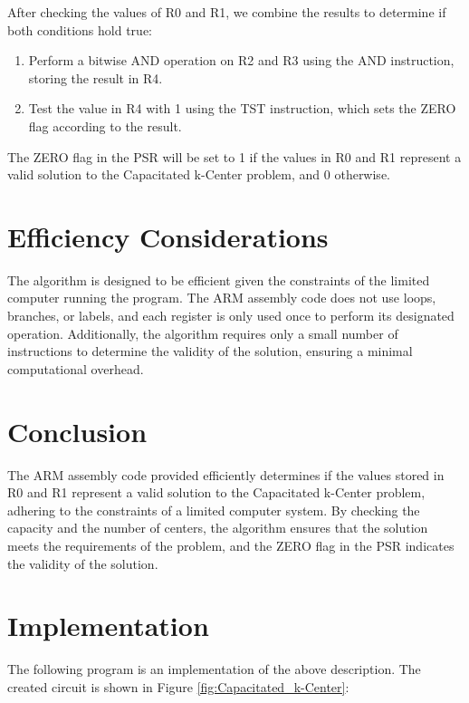After checking the values of R0 and R1, we combine the results to determine if both conditions hold true:

\begin{enumerate}
    \item Perform a bitwise AND operation on R2 and R3 using the AND instruction, storing the result in R4.
    \item Test the value in R4 with 1 using the TST instruction, which sets the ZERO flag according to the result.
\end{enumerate}

The ZERO flag in the PSR will be set to 1 if the values in R0 and R1 represent a valid solution to the Capacitated k-Center problem, and 0 otherwise.

\section{Efficiency Considerations}

The algorithm is designed to be efficient given the constraints of the limited computer running the program. The ARM assembly code does not use loops, branches, or labels, and each register is only used once to perform its designated operation. Additionally, the algorithm requires only a small number of instructions to determine the validity of the solution, ensuring a minimal computational overhead.

\section{Conclusion}

The ARM assembly code provided efficiently determines if the values stored in R0 and R1 represent a valid solution to the Capacitated k-Center problem, adhering to the constraints of a limited computer system. By checking the capacity and the number of centers, the algorithm ensures that the solution meets the requirements of the problem, and the ZERO flag in the PSR indicates the validity of the solution.



\section{Implementation}

The following program is an implementation of the above description. The created circuit is shown in Figure \ref{fig:Capacitated_k-Center}:

